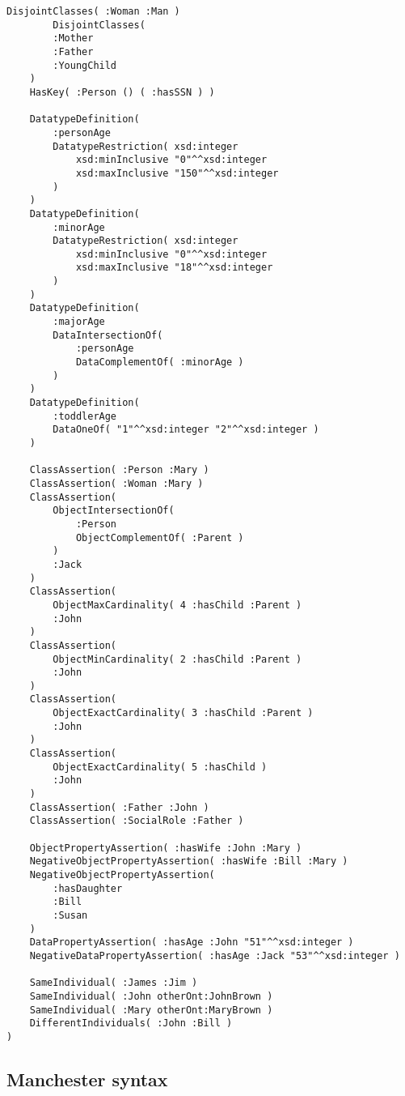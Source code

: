 \documentclass[11pt,a4paper,final,oneside,onecolumn]{article}
\begin{document}
\begin{lstlisting}[language=Functional-style]
	DisjointClasses( :Woman :Man )
		DisjointClasses(
		:Mother
		:Father
		:YoungChild
	)
	HasKey( :Person () ( :hasSSN ) )
	
	DatatypeDefinition(
		:personAge
		DatatypeRestriction( xsd:integer
			xsd:minInclusive "0"^^xsd:integer
			xsd:maxInclusive "150"^^xsd:integer
		)
	)
	DatatypeDefinition(
		:minorAge
		DatatypeRestriction( xsd:integer
			xsd:minInclusive "0"^^xsd:integer
			xsd:maxInclusive "18"^^xsd:integer
		)
	)
	DatatypeDefinition(
		:majorAge
		DataIntersectionOf(
			:personAge
			DataComplementOf( :minorAge )
		)
	)
	DatatypeDefinition(
		:toddlerAge
		DataOneOf( "1"^^xsd:integer "2"^^xsd:integer ) 
	)
	
	ClassAssertion( :Person :Mary )
	ClassAssertion( :Woman :Mary )
	ClassAssertion(
		ObjectIntersectionOf(
			:Person
			ObjectComplementOf( :Parent )
		)
		:Jack
	)
	ClassAssertion(
		ObjectMaxCardinality( 4 :hasChild :Parent )
		:John
	)
	ClassAssertion(
		ObjectMinCardinality( 2 :hasChild :Parent )
		:John
	)
	ClassAssertion(
		ObjectExactCardinality( 3 :hasChild :Parent ) 
		:John
	)
	ClassAssertion(
		ObjectExactCardinality( 5 :hasChild )
		:John
	)
	ClassAssertion( :Father :John )
	ClassAssertion( :SocialRole :Father )
	
	ObjectPropertyAssertion( :hasWife :John :Mary )
	NegativeObjectPropertyAssertion( :hasWife :Bill :Mary )
	NegativeObjectPropertyAssertion(
		:hasDaughter
		:Bill
		:Susan
	)
	DataPropertyAssertion( :hasAge :John "51"^^xsd:integer )
	NegativeDataPropertyAssertion( :hasAge :Jack "53"^^xsd:integer )
	
	SameIndividual( :James :Jim )
	SameIndividual( :John otherOnt:JohnBrown )
	SameIndividual( :Mary otherOnt:MaryBrown )
	DifferentIndividuals( :John :Bill )
)
	\end{lstlisting}
	
	\subsection{Manchester syntax}
	
\end{document}
